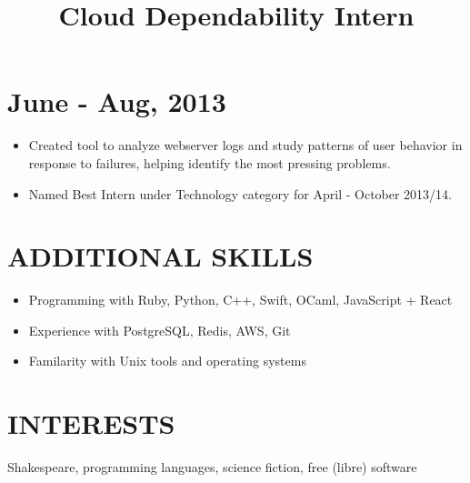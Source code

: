 \documentclass[centered, margin, 10pt]{res} %
\newcommand\mainsectionfont{\normalsize\bf\textup}
\renewcommand\sectionfont{\mainsectionfont} %
\renewcommand\dates{\section} %
\newenvironment{rlist}
    {\begin{minipage}[t]{\linewidth}\begin{itemize}\raggedright}
    {\end{itemize}\end{minipage}}
\newenvironment{positionlist}
    {\begin{position}\begin{rlist}}
    {\end{rlist}\end{position}}
\begin{document}
\begin{resume}
\title{Cloud Dependability Intern}
\dates{June - Aug, 2013}
\begin{positionlist}
  \item Created tool to analyze webserver logs and study patterns of user
    behavior in response to failures, helping identify the most pressing
    problems.
  \item Named Best Intern under Technology category for April - October 2013/14.
\end{positionlist}


\renewcommand\sectionfont{\mainsectionfont} %


\section{ADDITIONAL SKILLS}
\begin{rlist}
  \item Programming with Ruby, Python, C++, Swift, OCaml, JavaScript + React
  \item Experience with PostgreSQL, Redis, AWS, Git
  \item Familarity with Unix tools and operating systems
\end{rlist}


\section{INTERESTS}
Shakespeare, programming languages, science fiction, free (libre) software


\end{resume}
\end{document}
